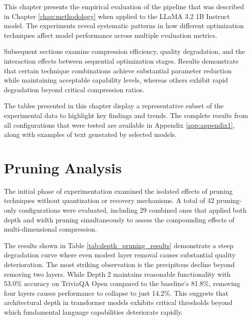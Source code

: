 

This chapter presents the empirical evaluation of the pipeline that was described in Chapter \ref{chap:methodology} when applied to the LLaMA 3.2 1B Instruct model. The experiments reveal systematic patterns in how different optimization techniques affect model performance across multiple evaluation metrics.

Subsequent sections examine compression efficiency, quality degradation, and the interaction effects between sequential optimization stages. Results demonstrate that certain technique combinations achieve substantial parameter reduction while maintaining acceptable capability levels, whereas others exhibit rapid degradation beyond critical compression ratios.

The tables presented in this chapter display a representative subset of the experimental data to highlight key findings and trends. The complete results from all configurations that were tested are available in Appendix \ref{app:appendix1}, along with examples of text generated by selected models.

\section{Pruning Analysis}

The initial phase of experimentation examined the isolated effects of pruning techniques without quantization or recovery mechanisms. A total of 42 pruning-only configurations were evaluated, including 29 combined ones that applied both depth and width pruning simultaneously to assess the compounding effects of multi-dimensional compression.

The results shown in Table \ref{tab:depth_pruning_results} demonstrate a steep degradation curve where even modest layer removal causes substantial quality deterioration. The most striking observation is the precipitous decline beyond removing two layers. While Depth 2 maintains reasonable functionality with 53.0\% accuracy on TriviaQA Open compared to the baseline's 81.8\%, removing four layers causes performance to collapse to just 14.2\%. This suggests that architectural depth in transformer models exhibits critical thresholds beyond which fundamental language capabilities deteriorate rapidly.

